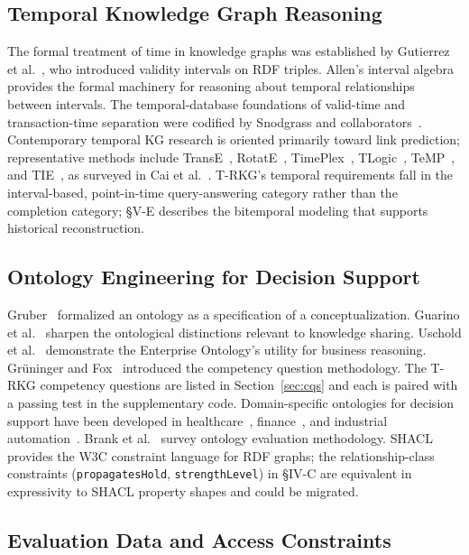 \documentclass{ieeeaccess}
\begin{document}
\subsection{Temporal Knowledge Graph Reasoning}

The formal treatment of time in knowledge graphs was established by Gutierrez et al.~\cite{gutierrez2007}, who introduced validity intervals on RDF triples. Allen's interval algebra~\cite{allen1983} provides the formal machinery for reasoning about temporal relationships between intervals. The temporal-database foundations of valid-time and transaction-time separation were codified by Snodgrass and collaborators~\cite{snodgrass1995,jensen1997}. Contemporary temporal KG research is oriented primarily toward link prediction; representative methods include TransE~\cite{transe}, RotatE~\cite{rotate}, TimePlex~\cite{timeplex}, TLogic~\cite{tlogic}, TeMP~\cite{temp}, and TIE~\cite{tie}, as surveyed in Cai et al.~\cite{cai2023}. T-RKG's temporal requirements fall in the interval-based, point-in-time query-answering category rather than the completion category; §V-E describes the bitemporal modeling that supports historical reconstruction.

\subsection{Ontology Engineering for Decision Support}

Gruber~\cite{gruber1995} formalized an ontology as a specification of a conceptualization. Guarino et al.~\cite{guarino2009} sharpen the ontological distinctions relevant to knowledge sharing. Uschold et al.~\cite{uschold1998} demonstrate the Enterprise Ontology's utility for business reasoning. Gr\"{u}ninger and Fox~\cite{gruninger1995} introduced the competency question methodology. The T-RKG competency questions are listed in Section~\ref{sec:cqs} and each is paired with a passing test in the supplementary code. Domain-specific ontologies for decision support have been developed in healthcare~\cite{schriml2019}, finance~\cite{fibo}, and industrial automation~\cite{ringsquandl2015}. Brank et al.~\cite{brank2005} survey ontology evaluation methodology. SHACL~\cite{shacl} provides the W3C constraint language for RDF graphs; the relationship-class constraints (\texttt{propagatesHold}, \texttt{strengthLevel}) in §IV-C are equivalent in expressivity to SHACL property shapes and could be migrated.

\subsection{Evaluation Data and Access Constraints}
\end{document}

